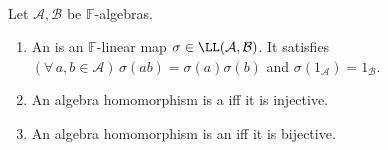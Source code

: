 \begin{definition} \label{def:algebra-homomorphism} \\
Let $\mathcal{A},\mathcal{B}$ be $\mathbb{F}$-algebras.
\begin{enumerate}[label=(\roman*)]
\setlength{\itemsep}{0pt}
\item An  is an $\mathbb{F}$-linear map $\sigma\in\LL(\mathcal{A},\mathcal{B})$. It satisfies $(\forall\,a,b\in\mathcal{A})\,\sigma(ab)=\sigma(a)\sigma(b)$ and $\sigma(1_{\mathcal{A}})=1_{\mathcal{B}}$.
\item An algebra homomorphism is a  iff it is injective.
\item An algebra homomorphism is an  iff it is bijective.
\end{enumerate}
\end{definition}

